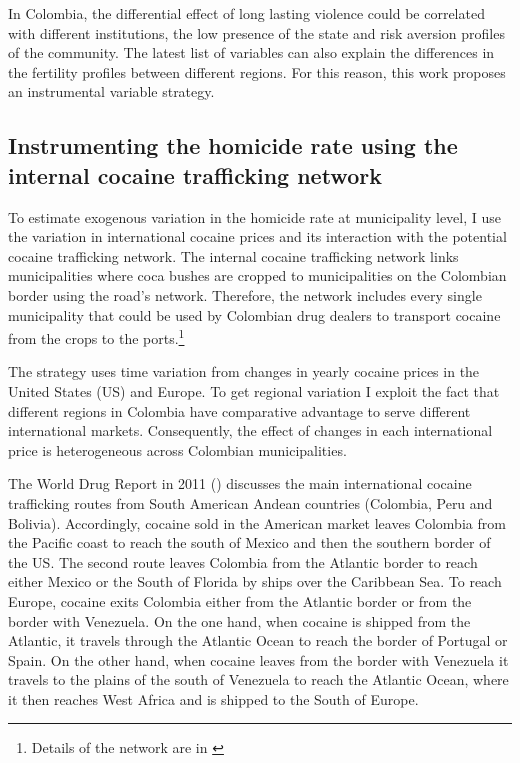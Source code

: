 \documentclass[a4paper,10pt,twocolumn,preprint,3p,authoryear]{elsarticle}
\begin{document}
In Colombia, the differential effect of long lasting violence could be correlated with different institutions, the low presence of the state and risk aversion profiles of the community. The latest list of variables can also explain the differences in the fertility profiles between different regions. For this reason, this work proposes an instrumental variable strategy. 

\subsection{Instrumenting the homicide rate using the internal cocaine trafficking network}

To estimate exogenous variation in the homicide rate at municipality level, I use the variation in international cocaine prices and its interaction with the potential cocaine trafficking network. The internal cocaine trafficking network links municipalities where coca bushes are cropped to municipalities on the Colombian border using the road's network. Therefore, the network includes every single municipality that could be used by Colombian drug dealers to transport cocaine from the crops to the ports.\footnote{Details of the network are in \citet{Millan2014Trafficking}} 

The strategy uses time variation from changes in yearly cocaine prices in the United States (US) and Europe.  To get regional variation I exploit the fact that different regions in Colombia have comparative advantage to serve different international markets. Consequently, the effect of changes in each international price is heterogeneous across Colombian municipalities.   

The World Drug Report in 2011 (\citet{UNODC20002012}) discusses the main international cocaine trafficking routes from South American Andean countries (Colombia, Peru and Bolivia). Accordingly, cocaine sold in the American market leaves Colombia from the Pacific coast to reach the south of Mexico and then the southern border of the US. The second route leaves Colombia from the Atlantic border to reach either Mexico or the South of Florida by ships over the Caribbean Sea. To reach Europe, cocaine exits Colombia either from the Atlantic border or from the border with Venezuela. On the one hand,  when cocaine is shipped from the Atlantic, it travels through the Atlantic Ocean to reach the border of Portugal or Spain. On the other hand, when cocaine leaves from the border with Venezuela it travels to the plains of the south of Venezuela to reach the Atlantic Ocean, where it then reaches West Africa and is shipped to the South of Europe. 
\end{document}
